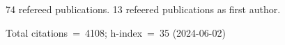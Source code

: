 74 refereed publications. 13 refeered publications as first author.

Total citations~=~4108; h-index~=~35 (2024-06-02)